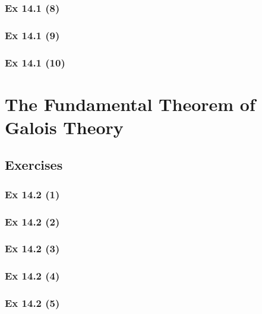 \subsubsection{Ex 14.1 (8)}\label{sec:Ex_14.1.8}

\subsubsection{Ex 14.1 (9)}\label{sec:Ex_14.1.9}

\subsubsection{Ex 14.1 (10)}\label{sec:Ex_14.1.10}

\newpage		%

\section{The Fundamental Theorem of Galois Theory}\label{sec:14.2}	
\subsection*{Exercises}\label{sec:14.2_Exercises}

\subsubsection{Ex 14.2 (1)}\label{sec:Ex_14.2.1}

\subsubsection{Ex 14.2 (2)}\label{sec:Ex_14.2.2}

\subsubsection{Ex 14.2 (3)}\label{sec:Ex_14.2.3}

\subsubsection{Ex 14.2 (4)}\label{sec:Ex_14.2.4}

\subsubsection{Ex 14.2 (5)}\label{sec:Ex_14.2.5}

